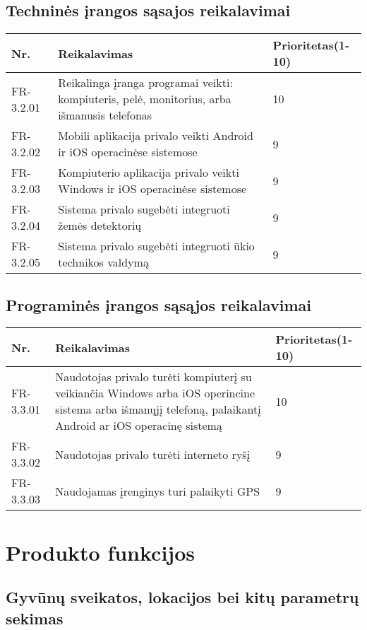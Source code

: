 \documentclass[oneside]{VUMIFPSkursinis}
\begin{document}
\subsection{Techninės įrangos sąsajos reikalavimai}
\begin{table}[htbp]
	\begin{tabularx}{1\textwidth}{ |P{2.5cm}|X|P{3cm }| }  \hline
		Nr. & Reikalavimas & Prioritetas(1-10) \\ \hline
		FR-3.2.01 & Reikalinga įranga programai veikti: kompiuteris, pelė, monitorius, arba išmanusis telefonas & 10 \\ \hline
		FR-3.2.02 & Mobili aplikacija privalo veikti Android ir iOS operacinėse sistemose & 9 \\ \hline
		FR-3.2.03 & Kompiuterio aplikacija privalo veikti Windows ir iOS operacinėse sistemose & 9 \\ \hline
		FR-3.2.04 & Sistema privalo sugebėti integruoti žemės detektorių & 9 \\ \hline
		FR-3.2.05 & Sistema privalo sugebėti integruoti ūkio technikos valdymą & 9 \\ \hline
	\end{tabularx}
\end{table}
\subsection{Programinės įrangos sąsąjos reikalavimai}
\begin{table}[htbp]
	\begin{tabularx}{1\textwidth}{ |P{2.5cm}|X|P{3cm }| }  \hline
		Nr. & Reikalavimas & Prioritetas(1-10) \\ \hline
		FR-3.3.01 & Naudotojas privalo turėti kompiuterį su veikiančia Windows arba iOS operincine sistema arba išmanųjį telefoną, palaikantį Android ar iOS operacinę sistemą & 10 \\ \hline
		FR-3.3.02 & Naudotojas privalo turėti interneto ryšį & 9 \\ \hline
		FR-3.3.03 & Naudojamas įrenginys turi palaikyti GPS & 9 \\ \hline
	\end{tabularx}
\end{table}

\section{Produkto funkcijos}

\subsection{Gyvūnų sveikatos, lokacijos bei kitų parametrų sekimas}
\end{document}

